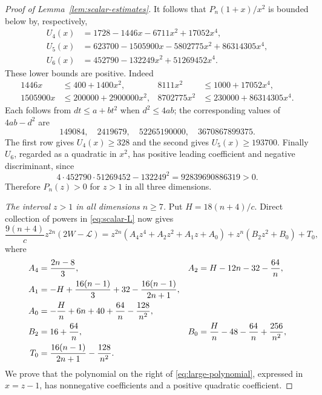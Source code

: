 \begin{proof}[Proof of Lemma~\ref{lem:scalar-estimates}]
It follows that $P_n(1+x)/x^2$ is bounded below by, respectively,
\begin{align*}
 U_4(x)&=1728-1446x-6711x^2+17052x^4,\\
 U_5(x)&=623700-1505900x-5802775x^2+86314305x^4,\\
 U_6(x)&=452790-132249x^2+51269452x^4.
\end{align*}
These lower bounds are positive.  Indeed
\begin{align*}
 1446x&\le400+1400x^2,&
 8111x^2&\le1000+17052x^4,\\
 1505900x&\le200000+2900000x^2,&
 8702775x^2&\le230000+86314305x^4.
\end{align*}
Each follows from $dt\le a+bt^2$ when $d^2\le4ab$; the corresponding
values of $4ab-d^2$ are
\[
 149084,\quad 2419679,\quad 52265190000,\quad 3670867899375.
\]
The first row gives $U_4(x)\ge328$ and the second gives
$U_5(x)\ge193700$.  Finally $U_6$, regarded as a quadratic in $x^2$,
has positive leading coefficient and negative discriminant, since
\[
 4\cdot452790\cdot51269452-132249^2=92839690886319>0.
\]
Therefore $P_n(z)>0$ for $z>1$ in all three dimensions.

\medskip
\noindent\emph{The interval $z>1$ in all dimensions $n\ge7$.}
Put $H=18(n+4)/c$.  Direct collection of powers in
\eqref{eq:scalar-L} now gives
\begin{equation}\label{eq:large-polynomial}
 \frac{9(n+4)}{c}z^{2n}(2W-\mathcal L)
 =z^{2n}(A_4z^4+A_2z^2+A_1z+A_0)
   +z^n(B_2z^2+B_0)+T_0,
\end{equation}
where
\begin{align}
 A_4&=\frac{2n-8}{3},&
 A_2&=H-12n-32-\frac{64}{n},\notag\\
 A_1&=-H+\frac{16(n-1)}3+32-\frac{16(n-1)}{2n+1},&&\notag\\
 A_0&=-\frac Hn+6n+40+\frac{64}{n}-\frac{128}{n^2},&&\notag\\
 B_2&=16+\frac{64}{n},&
 B_0&=\frac Hn-48-\frac{64}{n}+\frac{256}{n^2},\notag\\
 T_0&=\frac{16(n-1)}{2n+1}-\frac{128}{n^2}.&&
 \label{eq:large-coefficients}
\end{align}
We prove that the polynomial on the right of
\eqref{eq:large-polynomial}, expressed in $x=z-1$, has nonnegative
coefficients and a positive quadratic coefficient.


\end{proof}
